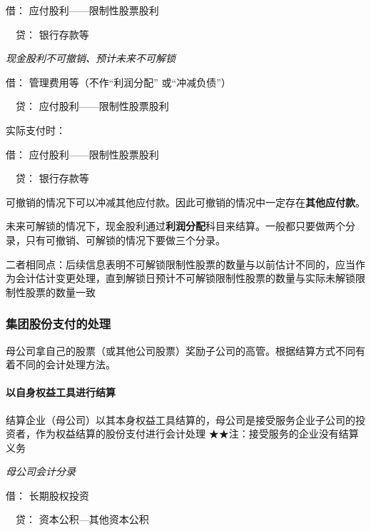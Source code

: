 \documentclass[UTF8,12pt]{ctexart}
\newenvironment{Dr}{\noindent 借：}{\par}
\newenvironment{Cr}{\noindent \ \ 贷：}{\par}
\numberwithin{equation}{section} %
\numberwithin{figure}{section}
\numberwithin{table}{section}
\begin{document}
	\begin{Dr}
		应付股利——限制性股票股利
	\end{Dr}
	\begin{Cr}
		银行存款等
	\end{Cr}
	
	\textit{现金股利不可撤销、预计未来不可解锁}
	
	\begin{Dr}
		管理费用等（不作“利润分配” 或“冲减负债”）
	\end{Dr}
	\begin{Cr}
		应付股利——限制性股票股利
	\end{Cr}
	
	实际支付时：
	
	\begin{Dr}
		应付股利——限制性股票股利
	\end{Dr}
	\begin{Cr}
		银行存款等
	\end{Cr}
	
	可撤销的情况下可以冲减其他应付款。因此可撤销的情况中一定存在\textbf{其他应付款}。
	
	未来可解锁的情况下，现金股利通过\textbf{利润分配}科目来结算。一般都只要做两个分录，只有可撤销、可解锁的情况下要做三个分录。
	
	二者相同点：后续信息表明不可解锁限制性股票的数量与以前估计不同的，应当作为会计估计变更处理，直到解锁日预计不可解锁限制性股票的数量与实际未解锁限制性股票的数量一致
	
	\subsubsection{集团股份支付的处理}
	母公司拿自己的股票（或其他公司股票）奖励子公司的高管。根据结算方式不同有着不同的会计处理方法。
	
	\paragraph{以自身权益工具进行结算}
	结算企业（母公司）以其本身权益工具结算的，母公司是接受服务企业子公司的投资者，作为权益结算的股份支付进行会计处理
	★★注：接受服务的企业没有结算义务
	
	\textit{母公司会计分录}
	
	\begin{Dr}
		长期股权投资
	\end{Dr}
	\begin{Cr}
		资本公积—其他资本公积
	\end{Cr}
	
\end{document}
